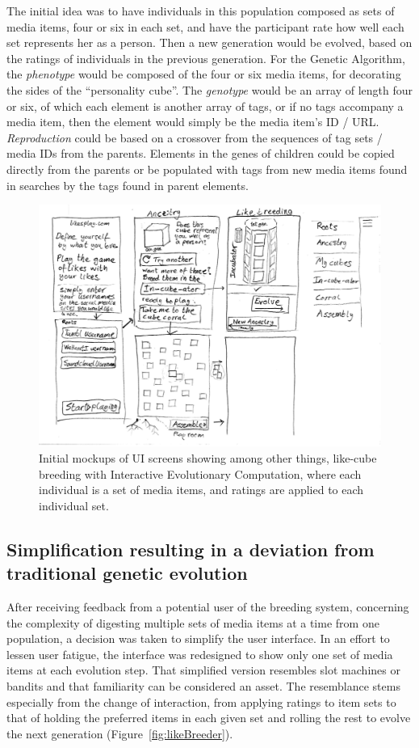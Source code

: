 \documentclass[conference]{IEEETran}
\begin{document}
The initial idea was to have individuals in this population composed as sets of media items, four or six in each set, and have the participant rate how well each set represents her as a person.  Then a new generation would be evolved, based on the ratings of individuals in the previous generation.  For the Genetic Algorithm, the \textit{phenotype} would be composed of the four or six media items, for decorating the sides of the “personality cube”.  
The \textit{genotype} would be an array of length four or six, of which each element is another array of tags, or if no tags accompany a media item, then the element would simply be the media item's ID / URL.
\textit{Reproduction} could be based on a crossover from the sequences of tag sets / media IDs from the parents.  
Elements in the genes of children could be copied directly from the parents or be populated with tags from new media items found in searches by the tags found in parent elements.
\begin{figure}[h!]
	\centerline{\includegraphics[width=\columnwidth]{breederUImockup.png}}
	\caption{Initial mockups of UI screens showing among other things, like-cube breeding with Interactive Evolutionary Computation, where each individual is a set of media items, and ratings are applied to each individual set.}
	\label{fig:breedingMockup}
\end{figure}


\subsection{Simplification resulting in a deviation from traditional genetic evolution}
\label{sec:Simplification}
After receiving feedback from a potential user of the breeding system, concerning the complexity of digesting multiple sets of media items at a time from one population, a decision was taken to simplify the user interface.  In an effort to lessen user fatigue, the interface was redesigned to show only one set of media items at each evolution step.  That simplified version resembles slot machines or bandits and that familiarity can be considered an asset.  The resemblance stems especially from the change of interaction, from applying ratings to item sets to that of holding the preferred items in each given set and rolling the rest to evolve the next generation (Figure~\ref{fig:likeBreeder}).
\end{document}
